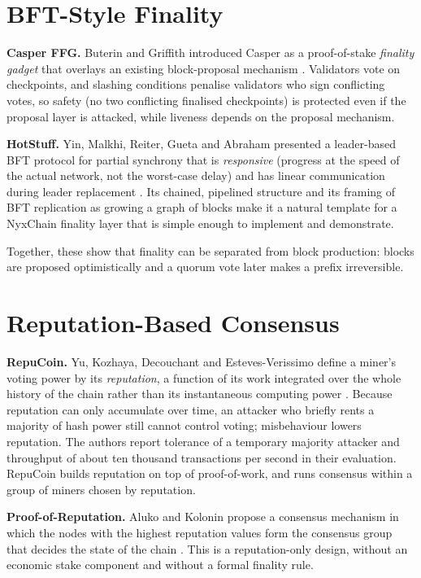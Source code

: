 \documentclass[11pt,a4paper]{article}
\begin{document}
\section{BFT-Style Finality}\label{sec:bft}

\textbf{Casper FFG.} Buterin and Griffith introduced Casper as a proof-of-stake \emph{finality gadget} that overlays an existing block-proposal mechanism \cite{buterin2017}. Validators vote on checkpoints, and slashing conditions penalise validators who sign conflicting votes, so safety (no two conflicting finalised checkpoints) is protected even if the proposal layer is attacked, while liveness depends on the proposal mechanism.

\textbf{HotStuff.} Yin, Malkhi, Reiter, Gueta and Abraham presented a leader-based BFT protocol for partial synchrony that is \emph{responsive} (progress at the speed of the actual network, not the worst-case delay) and has linear communication during leader replacement \cite{yin2019}. Its chained, pipelined structure and its framing of BFT replication as growing a graph of blocks make it a natural template for a NyxChain finality layer that is simple enough to implement and demonstrate.

Together, these show that finality can be separated from block production: blocks are proposed optimistically and a quorum vote later makes a prefix irreversible.

\section{Reputation-Based Consensus}\label{sec:rep}

\textbf{RepuCoin.} Yu, Kozhaya, Decouchant and Esteves-Verissimo define a miner's voting power by its \emph{reputation}, a function of its work integrated over the whole history of the chain rather than its instantaneous computing power \cite{yu2019}. Because reputation can only accumulate over time, an attacker who briefly rents a majority of hash power still cannot control voting; misbehaviour lowers reputation. The authors report tolerance of a temporary majority attacker and throughput of about ten thousand transactions per second in their evaluation. RepuCoin builds reputation on top of proof-of-work, and runs consensus within a group of miners chosen by reputation.

\textbf{Proof-of-Reputation.} Aluko and Kolonin propose a consensus mechanism in which the nodes with the highest reputation values form the consensus group that decides the state of the chain \cite{aluko2021}. This is a reputation-only design, without an economic stake component and without a formal finality rule.
\end{document}
